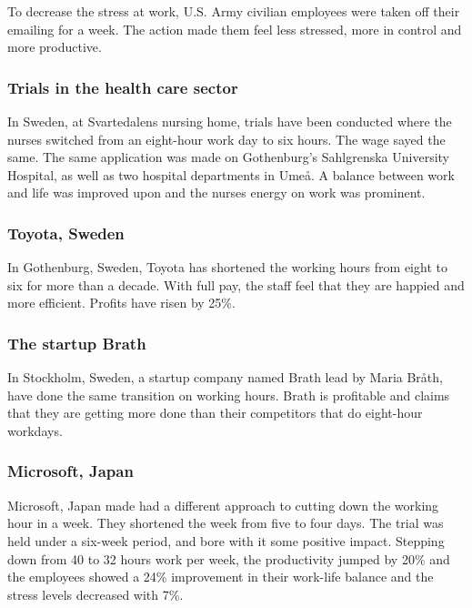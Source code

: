 \documentclass[12pt, a4paper]{article}
\begin{document}
    To decrease the stress at work, U.S. Army civilian employees were taken off their emailing for a week. The action made them feel less stressed, more in control and more productive.\cite{jettisoningworkemail}

    \subsubsection{Trials in the health care sector}
    In Sweden, at Svartedalens nursing home, trials have been conducted where the nurses switched from an eight-hour work day to six hours.\cite{swedennurses} The wage sayed the same. The same application was made on Gothenburg's Sahlgrenska University Hospital, as well as two hospital departments in Umeå. A balance between work and life was improved upon and the nurses energy on work was prominent.

    \subsubsection{Toyota, Sweden}
    In Gothenburg, Sweden, Toyota has shortened the working hours from eight to six for more than a decade.\cite{swedennurses} With full pay, the staff feel that they are happied and more efficient. Profits have risen by 25\%.

    \subsubsection{The startup Brath}
    In Stockholm, Sweden, a startup company named Brath lead by Maria Bråth, have done the same transition on working hours.\cite{brath} Brath is profitable and claims that they are getting more done than their competitors that do eight-hour workdays.

    \subsubsection{Microsoft, Japan}
    Microsoft, Japan made had a different approach to cutting down the working hour in a week. They shortened the week from five to four days.\cite{microsoft} The trial was held under a six-week period, and bore with it some positive impact. Stepping down from 40 to 32 hours work per week, the productivity jumped by 20\% and the employees showed a 24\% improvement in their work-life balance and the stress levels decreased with 7\%.
\end{document}

